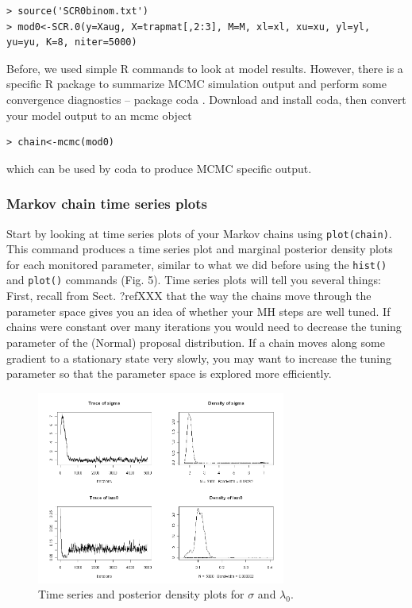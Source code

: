 \begin{verbatim}
> source('SCR0binom.txt')
> mod0<-SCR.0(y=Xaug, X=trapmat[,2:3], M=M, xl=xl, xu=xu, yl=yl, yu=yu, K=8, niter=5000)
\end{verbatim}

Before, we used simple R commands to look at model results. However, there is a specific R package to summarize MCMC simulation output and perform some convergence diagnostics -- package coda \citep{plummer_etal:2006}. Download and install coda, then convert your model output to an mcmc object
\begin{verbatim}
> chain<-mcmc(mod0)
\end{verbatim} which can be used by coda to produce MCMC specific output.

\subsubsection{Markov chain time series plots}
Start by looking at time series plots of your Markov chains using \verb#plot(chain)#. This command produces a time series plot and marginal posterior density plots for each monitored parameter, similar to what we did before using the \verb#hist()# and \verb#plot()# commands (Fig. 5). Time series plots will tell you several things:
First, recall from Sect. ?ref{XXX} that the way the chains move through the parameter space gives you an idea of whether your MH steps are well tuned. If chains were constant over many iterations you would need to decrease the tuning parameter of the (Normal) proposal distribution. If a chain moves along some gradient to a stationary state very slowly, you may want to increase the tuning parameter so that the parameter space is explored more efficiently.


\begin{figure}
\begin{center}
\includegraphics[height=2.5in]{Ch7/figs/timeseries}
\end{center}
\caption{Time series and posterior density plots for $\sigma$ and $\lambda_0$.}
\label{timeseries.fig}
\end{figure}


